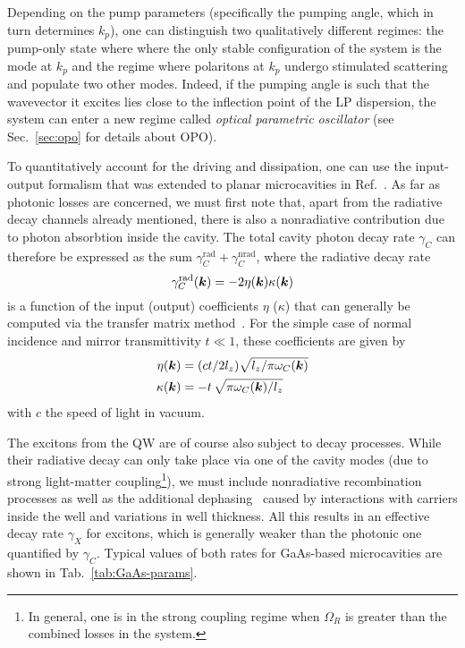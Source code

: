 Depending on the pump parameters (specifically the pumping angle,
which in turn determines $k_p$), one can distinguish two qualitatively
different regimes: the pump-only state where where the only stable
configuration of the system is the mode at $k_p$ and the regime where
polaritons at $k_p$ undergo stimulated scattering and populate two
other modes. Indeed, if the pumping angle is such that the wavevector
it excites lies close to the inflection point of the LP dispersion,
the system can enter a new regime called \textit{optical parametric
  oscillator} (see Sec.~\ref{sec:opo} for details about OPO).

To quantitatively account for the driving and dissipation, one can use
the input-output formalism that was extended to planar microcavities
in Ref.~\cite{Ciuti2006}. As far as photonic losses are concerned, we
must first note that, apart from the radiative decay channels already
mentioned, there is also a nonradiative contribution due to photon
absorbtion inside the cavity. The total cavity photon decay rate
$\gamma_C$ can therefore be expressed as the sum
$\gamma_C^{\text{rad}} + \gamma_C^{\text{nrad}}$, where the radiative
decay rate
%
\begin{equation}\label{eq:rad-decay}
  \gamma_C^{\text{rad}}(\bm{k}) = -2 \eta(\bm{k})\kappa(\bm{k})
\end{equation}
% 
is a function of the input (output) coefficients $\eta$ ($\kappa$)
that can generally be computed via the transfer matrix
method~\cite{burstein2012confined}. For the simple case of normal
incidence and mirror transmittivity $t \ll 1$, these coefficients are
given by~\cite{Carusotto_2013}
\begin{align}
  \begin{split}
    \eta(\bm{k}) & =(c t/2l_z) \sqrt{l_z/\pi\omega_C(\bm{k})}\\
    \kappa(\bm{k}) & =-t\,\sqrt{\pi \omega_C(\bm{k}) / l_z}  
  \end{split}
\end{align}
with $c$ the speed of light in vacuum.

The excitons from the QW are of course also subject to decay
processes. While their radiative decay can only take place via one of
the cavity modes (due to strong light-matter coupling\footnote{In
  general, one is in the strong coupling regime when $\Omega_R$ is
  greater than the combined losses in the system.}), we must include
nonradiative recombination processes as well as the additional
dephasing~\cite{Liew2011} caused by interactions with carriers inside
the well and variations in well thickness. All this results in an
effective decay rate $\gamma_X$ for excitons, which is generally
weaker than the photonic one quantified by $\gamma_C$. Typical values
of both rates for GaAs-based microcavities are shown in
Tab.~\ref{tab:GaAs-params}.



